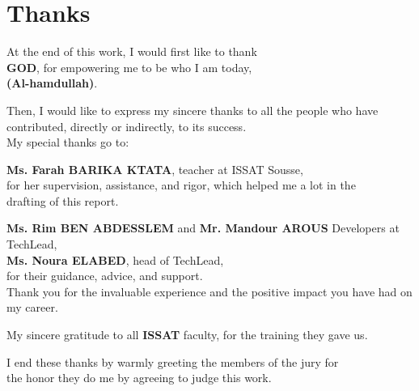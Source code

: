 \chapter*{Thanks}
\thispagestyle{empty}
%
\begin{center}
At the end of this work, I would first like to thank ~\\

\textbf{GOD}, for empowering me to be who I am today, ~\\

\textbf{(Al-hamdullah)}. ~\\
         \vspace{2\baselineskip}

Then, I would like to express my sincere thanks to
all the people who have contributed, directly or indirectly, to its success. ~\\
My special thanks go to: ~\\
         \vspace{2\baselineskip}


\textbf{Ms. Farah BARIKA KTATA}, teacher at ISSAT Sousse, ~\\
for her supervision, assistance, and rigor, which helped me a lot in the ~\\
drafting of this report. ~\\
         \vspace{2\baselineskip}

\textbf{Ms. Rim BEN ABDESSLEM} and \textbf{Mr. Mandour AROUS} Developers at TechLead,~\\
\textbf{Ms. Noura ELABED}, head of TechLead, ~\\
for their guidance, advice, and support. ~\\
Thank you for the invaluable experience and the positive impact you have had on my career. ~\\
         \vspace{2\baselineskip}


My sincere gratitude to all \textbf{ISSAT} faculty, for the training they gave us. ~\\
         \vspace{2\baselineskip}


I end these thanks by warmly greeting the members of the jury for ~\\

the honor they do me by agreeing to judge this work. ~\\
\end{center}


\cleardoublepage%
